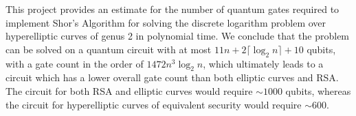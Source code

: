 This project provides an estimate for the number of quantum gates required to implement Shor's Algorithm for solving the discrete logarithm problem over hyperelliptic curves of genus 2 in polynomial time. We conclude that the problem can be solved on a quantum circuit with at most $11n+2\lceil\log_2n\rceil+10$ qubits, with a gate count in the order of $1472n^3\log_2n$, which ultimately leads to a circuit which has a lower overall gate count than both elliptic curves and RSA. The circuit for both RSA and elliptic curves would require $\sim1000$ qubits, whereas the circuit for hyperelliptic curves of equivalent security would require $\sim600$.
